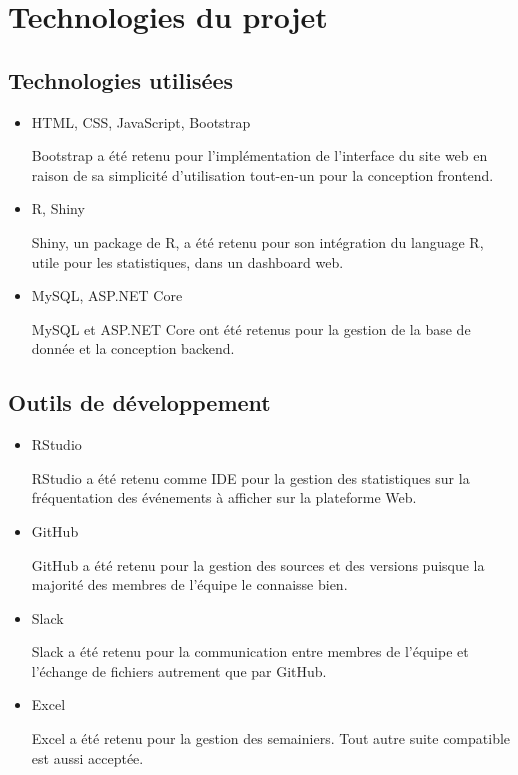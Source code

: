 \documentclass[letter,12pt]{exam}
\begin{document}
\section{Technologies du projet}

\subsection{Technologies utilisées}

\begin{itemize}
\tightlist
\item
  HTML, CSS, JavaScript, Bootstrap
  
  Bootstrap a été retenu pour l'implémentation de l'interface du site web en raison de sa simplicité d'utilisation tout-en-un pour la conception frontend.
\item
  R, Shiny
  
  Shiny, un package de R, a été retenu pour son intégration du language R, utile pour les statistiques, dans un dashboard web.
\item
  MySQL, ASP.NET Core
  
  MySQL et ASP.NET Core ont été retenus pour la gestion de la base de donnée et la conception backend.
\end{itemize}

\subsection{Outils de développement}

\begin{itemize}

\item
  RStudio
  
  RStudio a été retenu comme IDE pour la gestion des statistiques sur la fréquentation des événements à afficher sur la plateforme Web.
  
\item
  GitHub
  
  GitHub a été retenu pour la gestion des sources et des versions puisque la majorité des membres de l'équipe le connaisse bien.
  
\item
  Slack
  
  Slack a été retenu pour la communication entre membres de l'équipe et l'échange de fichiers autrement que par GitHub.
\item
  Excel
  
  Excel a été retenu pour la gestion des semainiers. Tout autre suite compatible est aussi acceptée.

\end{itemize}
\end{document}
